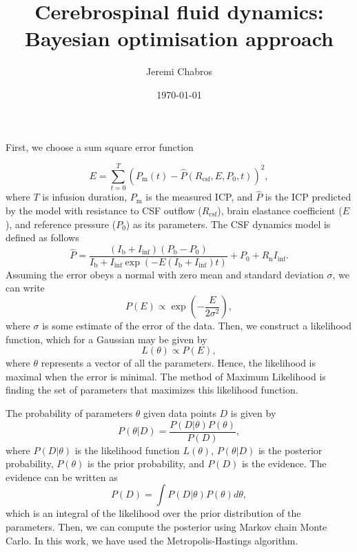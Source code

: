 \documentclass[12pt]{article}
\title{Cerebrospinal fluid dynamics: Bayesian optimisation approach}
\author{Jeremi Chabros}
\date{\today}
\newcommand{\rcsf}{R_\mathrm{csf}}
\newcommand{\pss}{P_\mathrm{0}}
\begin{document}
\maketitle

First, we choose a sum square error function
%

$$ E = \sum_{t=0}^{T}\left(P_\mathrm{m}(t) - \hat{P}\left(\rcsf, E, \pss, t\right)\right)^2 ,$$ 
%
where $T$ is infusion duration, $P_\mathrm{m}$ is the measured ICP, and $\hat{P}$ is the ICP predicted by the model with resistance to CSF outflow ($\rcsf$), brain elastance coefficient ($E$), and reference pressure ($\pss$) as its parameters. The CSF dynamics model is defined as follows
%
$$ \hat{P} = \frac{(I_\mathrm{b} + I_\mathrm{inf})(P_\mathrm{b} - P_\mathrm{0})}{I_\mathrm{b} + I_\mathrm{inf}\exp\left(-E\left(I_\mathrm{b} + I_\mathrm{inf}\right)t\right)} + \pss + R_\mathrm{n}I_\mathrm{inf}.$$
%
Assuming the error obeys a normal with zero mean and standard deviation $\sigma$, we can write
%
$$ P(E) \propto \exp \left(-\frac{E}{2\sigma^2}\right) ,$$
%
where $\sigma$ is some estimate of the error of the data. Then, we construct a likelihood function, which for a Gaussian may be given by
%
$$ L(\theta) \propto P(E) ,$$
%
where $\theta$ represents a vector of all the parameters. Hence, the likelihood is maximal when the error is minimal. The method of Maximum Likelihood is finding the set of parameters that maximizes this likelihood function.

The probability of parameters $\theta$ given data points $D$ is given by
%
$$ P(\theta|D) = \frac{P(D|\theta)P(\theta)}{P(D)} ,$$
%
where $P(D|\theta)$ is the likelihood function $L(\theta)$, $P(\theta|D)$ is the posterior probability, $P(\theta)$ is the prior probability, and $P(D)$ is the evidence. The evidence can be written as
%
$$ P(D)=\int P(D|\theta)P(\theta) d\theta ,$$
which is an integral of the likelihood over the prior distribution of the parameters. Then, we can compute the posterior using Markov chain Monte Carlo. In this work, we have used the Metropolis-Hastings algorithm.
\end{document}
